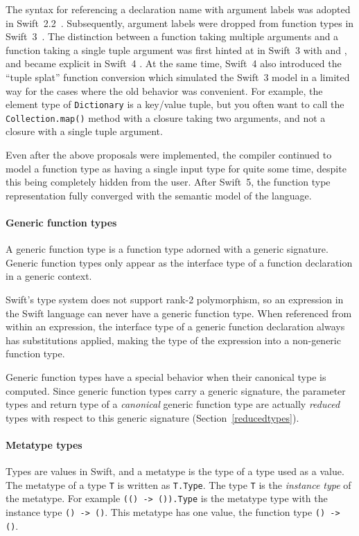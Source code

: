 \documentclass[a4paper,headsepline,bibliography=totoc,toc=flat,fleqn,twoside=semi]{scrbook}
\theoremstyle{definition}
\theoremstyle{definition}
\theoremstyle{definition}
\begin{document}
The syntax for referencing a declaration name with argument labels was adopted in Swift~2.2~\cite{se0021}. Subsequently, argument labels were dropped from function types in Swift~3~\cite{se0111}. The distinction between a function taking multiple arguments and a function taking a single tuple argument was first hinted at in Swift~3 with \cite{se0029} and \cite{se0066}, and became explicit in Swift~4 \cite{se0110}. At the same time, Swift~4 also introduced the ``tuple splat'' function conversion which simulated the Swift~3 model in a limited way for the cases where the old behavior was convenient. For example, the element type of \texttt{Dictionary} is a key/value tuple, but you often want to call the \texttt{Collection.map()} method with a closure taking two arguments, and not a closure with a single tuple argument.

Even after the above proposals were implemented, the compiler continued to model a function type as having a single input type for quite some time, despite this being completely hidden from the user. After Swift~5, the function type representation fully converged with the semantic model of the language.

\paragraph{Generic function types}
A generic function type is a function type adorned with a generic signature. Generic function types only appear as the interface type of a function declaration in a generic context. 

Swift's type system does not support rank-2 polymorphism, so an expression in the Swift language can never have a generic function type. When referenced from within an expression, the interface type of a generic function declaration always has substitutions applied, making the type of the expression into a non-generic function type.

Generic function types have a special behavior when their canonical type is computed. Since generic function types carry a generic signature, the parameter types and return type of a \emph{canonical} generic function type are actually \emph{reduced} types with respect to this generic signature (Section~\ref{reducedtypes}).

\paragraph{Metatype types}
Types are values in Swift, and a metatype is the type of a type used as a value. The metatype of a type \texttt{T} is written as \texttt{T.Type}. The type \texttt{T} is the \emph{instance type} of the metatype. For example \texttt{(()~->~()).Type} is the metatype type with the instance type \verb|() -> ()|. This metatype has one value, the function type \verb|() -> ()|.
\end{document}
